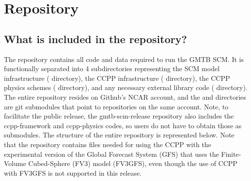 \chapter{Repository}
\label{chapter: repository}

\section{What is included in the repository?}
The repository contains all code and data required to run the GMTB SCM. It is functionally separated into 4 subdirectories representing the SCM model infrastructure ( directory), the CCPP infrastructure ( directory), the CCPP physics schemes ( directory), and any necessary external library code ( directory). The entire  repository resides on Github's NCAR account, and the  and  directories are git submodules that point to repositories on the same account. Note, to facilitate the public release, the gmtb-scm-release repository also includes the ccpp-framework and ccpp-physics codes, so users do not have to obtain those as submodules. The structure of the entire repository is represented below. Note that the  repository contains files needed for using the CCPP with the experimental version of the Global Forecast System (GFS) that uses the Finite-Volume Cubed-Sphere (FV3) model (FV3GFS), even though the use of CCPP with FV3GFS is not supported in this release.

